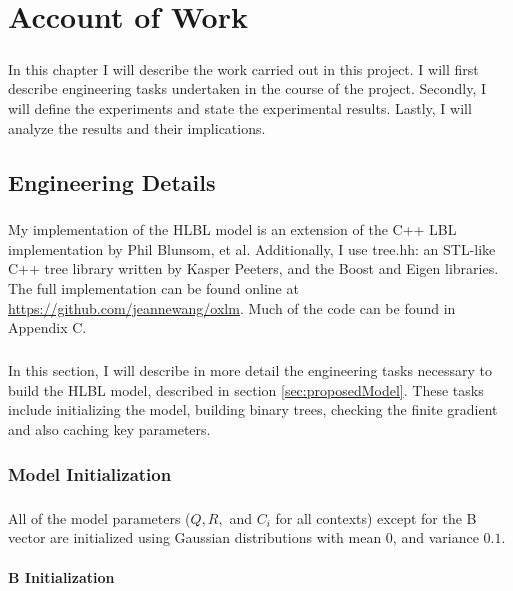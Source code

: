 
\chapter{Account of Work}
\paragraph{}
In this chapter I will describe the work carried out in this project. I will first describe engineering tasks undertaken in the course of the project. Secondly, I will define the experiments and state the experimental results. Lastly, I will analyze the results and their implications.

\section{Engineering Details}
\paragraph{}
My implementation of the HLBL model is an extension of the C++ LBL implementation by Phil Blunsom, et al. Additionally, I use tree.hh: an STL-like C++ tree library written by Kasper Peeters, and the Boost \cite{BoostSite} and Eigen \cite{eigenweb} libraries. The full implementation can be found online at \url{https://github.com/jeannewang/oxlm}. Much of the code can be found in Appendix C.
\paragraph{}
In this section, I will describe in more detail the engineering tasks necessary to build the HLBL model, described in section \ref{sec:proposedModel}. These tasks include initializing the model, building binary trees, checking the finite gradient and also caching key parameters.

\subsection{Model Initialization}
\paragraph{}
All of the model parameters ($Q,R,$ and $C_i$ for all contexts) except for the B vector are initialized using Gaussian distributions with mean $0$, and variance $0.1$.
\subsubsection{B Initialization}
